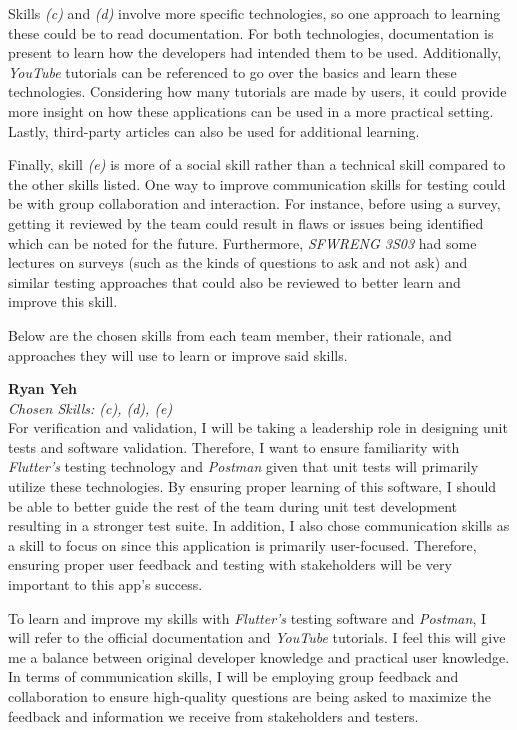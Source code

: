 \documentclass[12pt, titlepage]{article}
\begin{document}
\begin{enumerate}
  Skills \textit{(c)} and \textit{(d)} involve more specific technologies, so one approach to learning these
  could be to read documentation. For both technologies, documentation is present to learn how the
  developers had intended them to be used. Additionally, \textit{YouTube} tutorials can be referenced to
  go over the basics and learn these technologies. Considering how many tutorials are made by users, it
  could provide more insight on how these applications can be used in a more practical setting.
  Lastly, third-party articles can also be used for additional learning. \par

  Finally, skill \textit{(e)} is more of a social skill rather than a technical skill compared to the other skills listed.
  One way to improve communication skills for testing could be with group collaboration and
  interaction. For instance, before using a survey, getting it reviewed by the team could result in flaws or issues
  being identified which can be noted for the future. Furthermore, \textit{SFWRENG 3S03} had some lectures on surveys
  (such as the kinds of questions to ask and not ask) and similar testing approaches that could also be reviewed to better
  learn and improve this skill.

  Below are the chosen skills from each team member, their rationale, and approaches they will use to learn or
  improve said skills.

  \textbf{Ryan Yeh}\\
  \textit{Chosen Skills: (c), (d), (e)} \\
  For verification and validation, I will be taking a leadership role in designing unit tests and software
  validation. Therefore, I want to ensure familiarity with \textit{Flutter's} testing technology and \textit{Postman}
  given that unit tests will primarily utilize these technologies. By ensuring proper learning of
  this software, I should be able to better guide the rest of the team during unit test development resulting
  in a stronger test suite. In addition, I also chose communication skills as a skill to focus on since this application
  is primarily user-focused. Therefore, ensuring proper user feedback and testing with stakeholders will be very important
  to this app's success. \par
  To learn and improve my skills with \textit{Flutter's} testing software and \textit{Postman}, I will refer to the
  official documentation and \textit{YouTube} tutorials. I feel this will give me a balance between original developer
  knowledge and practical user knowledge. In terms of communication skills, I will be employing group feedback
  and collaboration to ensure high-quality questions are being asked to maximize the feedback and information we receive
  from stakeholders and testers.


\end{enumerate}
\end{document}
